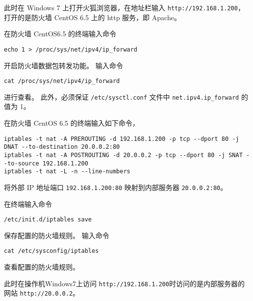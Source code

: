 此时在 Windows 7 上打开火狐浏览器，在地址栏输入
\texttt{http://192.168.1.200}，打开的是防火墙 CentOS 6.5 上的
http 服务，即 Apache。

在防火墙 CentOS6.5 的终端输入命令
\begin{verbatim}
echo 1 > /proc/sys/net/ipv4/ip_forward
\end{verbatim}
开启防火墙数据包转发功能。
输入命令
\begin{verbatim}
cat /proc/sys/net/ipv4/ip_forward
\end{verbatim}
进行查看。
此外，必须保证 \texttt{/etc/sysctl.conf} 文件中
\texttt{net.ipv4.ip_forward} 的值为 1。

在防火墙 CentOS 6.5 的终端输入如下命令，
\begin{verbatim}
iptables -t nat -A PREROUTING -d 192.168.1.200 -p tcp --dport 80 -j DNAT --to-destination 20.0.0.2:80
iptables -t nat -A POSTROUTING -d 20.0.0.2 -p tcp --dport 80 -j SNAT --to-source 192.168.1.200
iptables -t nat -L -n --line-numbers
\end{verbatim}
将外部 IP 地址端口 \texttt{192.168.1.200:80} 映射到内部服务器
\texttt{20.0.0.2:80}。

在终端输入命令
\begin{verbatim}
/etc/init.d/iptables save
\end{verbatim}
保存配置的防火墙规则。
输入命令
\begin{verbatim}
cat /etc/sysconfig/iptables
\end{verbatim}
查看配置的防火墙规则。

此时在操作机Windows7上访问
\texttt{http://192.168.1.200}时访问的是内部服务器的网站
\texttt{http://20.0.0.2}。
